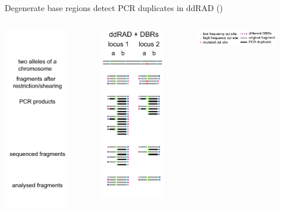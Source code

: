\documentclass[presentation]{beamer}
\begin{document}
\begin{frame}[label=sec-3-1-2]{Degenerate base regions detect PCR duplicates in ddRAD (\citep{Tin2014,Schweyen2014})}
\vspace{0.1cm}

\begin{columns}
\begin{column}{0.3\columnwidth}
\begin{raggedright}
\includegraphics[width=2.8cm]{Schweyen2014Fig2a.png}
\end{raggedright}
\end{column}

\begin{column}{0.3\columnwidth}
\begin{raggedleft}
\includegraphics[width=2.8cm]{Schweyen2014Fig2d.png}
\end{raggedleft}
\end{column}

\begin{column}{0.3\columnwidth}
\begin{raggedleft}
\includegraphics[width=3.5cm]{Schweyen2014Fig2e.png}
\end{raggedleft}
\tiny{\citep{Schweyen2014}}
\end{column}
\end{columns}
\end{frame}
\end{document}

